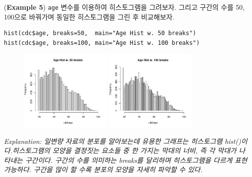 \documentclass{article}
\begin{document}
\newpage
(\textbf{Example 5}) \texttt{age} 변수를 이용하여 히스토그램을 그려보자. 그리고 구간의 수를 50, 100으로 바꿔가며 동일한 히스토그램을 그린 후 비교해보자.
\begin{lstlisting}[style={r-style}]
hist(cdc$age, breaks=50,  main="Age Hist w. 50 breaks")
hist(cdc$age, breaks=100, main="Age Hist w. 100 breaks")
\end{lstlisting}
\begin{figure}[htb!]
    \centering
    \includegraphics[width=0.4\textwidth]{fig/ex5-0.pdf}
    \includegraphics[width=0.4\textwidth]{fig/ex5-1.pdf}
    \label{fig:ex5}
\end{figure}
\emph{Explanation: 일변량 자료의 분포를 알아보는데 유용한 그래프는 히스토그램 hist()이다.히스토그램의 모양을 결정짓는 요소들 중 한 가지는 막대의 너비, 즉 각 막대가 나타내는 구간이다. 구간의 수를 의미하는 breaks를 달리하며 히스토그램을 다르게 표현 가능하다. 구간을 많이 할 수록 분포의 모양을 자세히 파악할 수 있다.} \\
\end{document}
